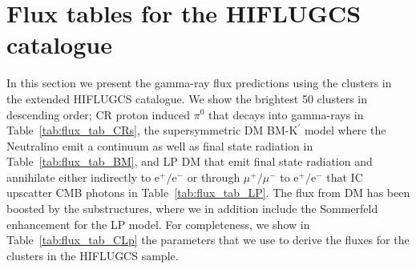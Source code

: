 \documentclass[10pt,aps,pra,reprint,amsmath,amsfonts,amssymb,showpacs,nofootinbib,floatfix]{revtex4-1}
\newcommand{\rmn}{\mathrm}
\newcommand{\Kp}{\rmn{K}^\prime}
\begin{document}
{\section{Flux tables for the HIFLUGCS catalogue}

In this section we present the gamma-ray flux predictions using the
clusters in the extended HIFLUGCS catalogue. We show the brightest 50
clusters in descending order; CR proton induced $\pi^0$ that decays
into gamma-rays in Table~\ref{tab:flux_tab_CRs}, the supersymmetric DM
BM-$\Kp$ model where the Neutralino emit a continuum as well as final
state radiation in Table~\ref{tab:flux_tab_BM}, and LP DM that emit
final state radiation and annihilate either indirectly to
$\rmn{e}^+/\rmn{e}^-$ or through $\mu^+/\mu^-$ to
$\rmn{e}^+/\rmn{e}^-$ that IC upscatter CMB photons in
Table~\ref{tab:flux_tab_LP}. The flux from DM has been boosted by the
substructures, where we in addition include the Sommerfeld enhancement
for the LP model. For completeness, we show in
Table~\ref{tab:flux_tab_CLp} the parameters that we use to derive the
fluxes for the clusters in the HIFLUGCS sample.

}
\end{document}
